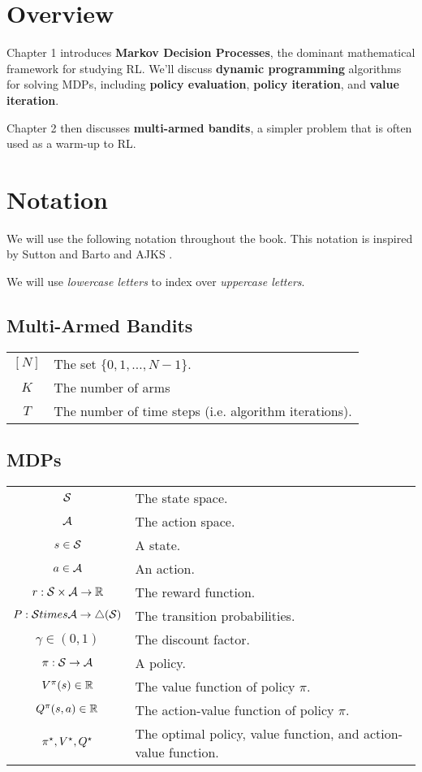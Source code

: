 \documentclass[\main/main]{subfiles}
\begin{document}
\section{Overview}

Chapter 1 introduces \textbf{Markov Decision Processes}, the dominant mathematical framework for studying RL. We'll discuss \textbf{dynamic programming} algorithms for solving MDPs, including \textbf{policy evaluation}, \textbf{policy iteration}, and \textbf{value iteration}.

Chapter 2 then discusses \textbf{multi-armed bandits}, a simpler problem that is often used as a warm-up to RL.

\section{Notation}

We will use the following notation throughout the book. This notation is inspired by Sutton and Barto  and AJKS .

We will use \emph{lowercase letters} to index over \emph{uppercase letters}.


\subsection{Multi-Armed Bandits}

\begin{tabular}{cl}
    $[N]$ & The set $\{0, 1, \dots, N-1\}$. \\
    $K$ & The number of arms \\
    $T$ & The number of time steps (i.e. algorithm iterations). \\
\end{tabular}

\subsection{MDPs}

\begin{tabular}{cl}
$\S$ & The state space. \\
$\A$ & The action space. \\
$s \in \S$ & A state. \\
$a \in \A$ & An action. \\
$r : \S \times \A \to \R$ & The reward function. \\
$P : \S times \A \to \triangle(\S)$ & The transition probabilities. \\
$\gamma \in (0, 1)$ & The discount factor. \\
$\pi : \S \to \A$ & A policy. \\
$V^\pi(s) \in \R$ & The value function of policy $\pi$. \\
$Q^\pi(s, a) \in \R$ & The action-value function of policy $\pi$. \\
$\pi^\star, \Vopt, \Qopt$ & The optimal policy, value function, and action-value function. \\
\end{tabular}
\end{document}
